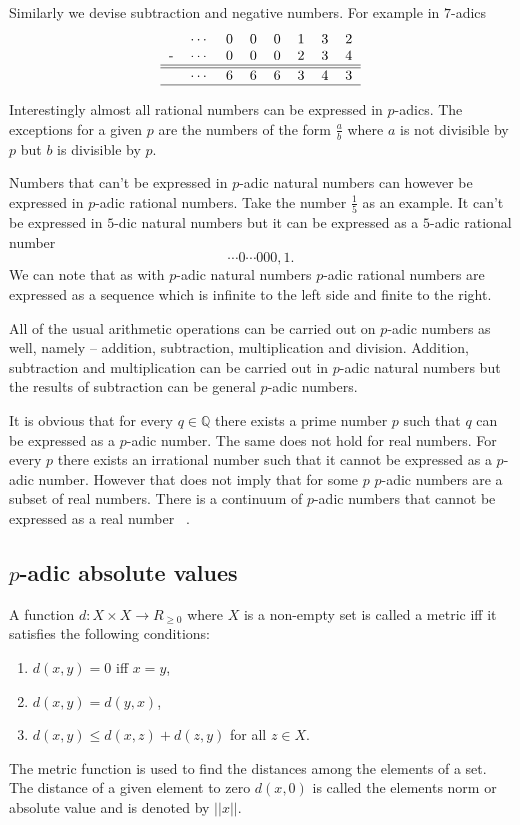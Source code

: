 \documentclass{llncs}
\begin{document}
Similarly we devise subtraction and negative numbers. For example in $7$-adics
\[
\begin{tabular}{rrrrrrrrr|}
&$\cdots$ &0 &0 &0 &1 &3 &2\\
-&$\cdots$ &0 &0 &0 &2 &3 &4\\
\hline
\hline
&$\cdots$ &6 &6 &6 &3 &4 &3\\
\hline
\end{tabular}
\]

Interestingly almost all rational numbers can be expressed in $p$-adics. The exceptions for a given $p$ are the numbers of the form $\frac{a}{b}$  where $a$ is not divisible by $p$ but $b$ is divisible by $p$.

Numbers that can't be expressed in $p$-adic natural numbers can however be expressed in $p$-adic rational numbers. Take the number $\frac{1}{5}$ as an example. It can't be expressed in $5$-dic natural numbers but it can be expressed as a $5$-adic rational number
\[
\cdots 0 \cdots 000,1.
\]
We can note that as with $p$-adic natural numbers $p$-adic rational numbers are expressed as a sequence which is infinite to the left side and finite to the right.

All of the usual arithmetic operations can be carried out on $p$-adic numbers as well, namely -- addition, subtraction, multiplication and division. Addition, subtraction and multiplication can be carried out in $p$-adic natural numbers %
but the results of subtraction can be general $p$-adic numbers.

It is obvious that for every $q \in \mathbb{Q}$ there exists a prime number $p$ such that $q$ can be expressed as a $p$-adic number. The same does not hold for real numbers. For every $p$ there exists an irrational number such that it cannot be expressed as a $p$-adic number. However that does not imply that for some $p$ $p$-adic numbers are a subset of real numbers. There is a continuum of $p$-adic numbers %
that cannot be expressed as a real number ~\citep{Freivalds2012}.

\subsection{$p$-adic absolute values}
A function $d: X \times X \rightarrow R_{\geq 0}$ where $X$ is a non-empty set is called a metric iff it satisfies the following conditions:
\begin{enumerate}
\item $d(x,y) = 0$ iff $x = y$,
\item $d(x,y) = d(y,x)$,
\item $d(x,y) \leq d(x,z) + d(z,y)$ for all $z \in X$.
\end{enumerate}
The metric function is used to find the distances among the elements of a set. The distance of a given element to zero $d(x,0)$ is called the elements norm or absolute value and is denoted by $||x||$.
\end{document}
